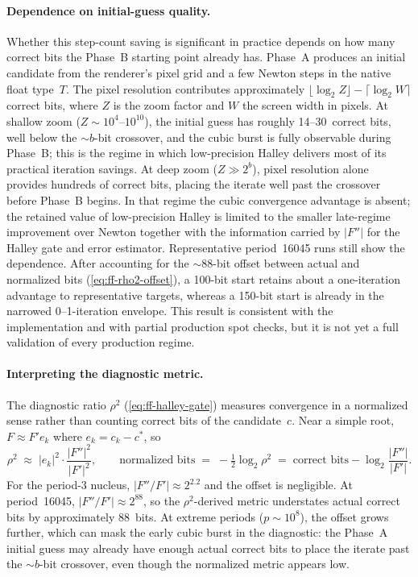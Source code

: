 \paragraph{Dependence on initial-guess quality.}
Whether this step-count saving is significant in practice depends on how many
correct bits the Phase~B starting point already has.  Phase~A produces an
initial candidate from the renderer's pixel grid and a few Newton steps in
the native float type~$T$.  The pixel resolution contributes approximately
$\lfloor\log_2 Z\rfloor - \lceil\log_2 W\rceil$ correct bits, where $Z$ is
the zoom factor and $W$ the screen width in pixels.  At shallow zoom
($Z \sim 10^{4}$--$10^{10}$), the initial guess has roughly 14--30~correct
bits, well below the ${\sim}b$-bit crossover, and the cubic burst is fully
observable during Phase~B; this is the regime in which low-precision Halley
delivers most of its practical iteration savings.  At deep zoom ($Z \gg 2^b$),
pixel resolution alone provides hundreds of correct bits, placing the iterate
well past the crossover before Phase~B begins.  In that regime the cubic
convergence advantage is absent; the retained value of low-precision Halley is
limited to the smaller late-regime improvement over Newton together with the
information carried by $|F''|$ for the Halley gate and error estimator.
Representative period~16045 runs still show the dependence.  After accounting
for the ${\sim}88$-bit offset between actual and normalized bits
(\cref{eq:ff-rho2-offset}), a 100-bit start retains about a one-iteration
advantage to representative targets, whereas a 150-bit start is already in the
narrowed 0--1-iteration envelope.  This result is consistent with the implementation
and with partial production spot checks, but it is not yet a full validation of
every production regime.

\paragraph{Interpreting the diagnostic metric.}
The diagnostic ratio $\rho^2$ (\cref{eq:ff-halley-gate}) measures
convergence in a normalized sense rather than counting correct bits of
the candidate~$c$.  Near a simple root, $F \approx F' e_k$ where
$e_k = c_k - c^*$, so
\begin{equation}\label{eq:ff-rho2-offset}
\rho^2 \;\approx\; |e_k|^2 \cdot \frac{|F''|^2}{|F'|^2},
\qquad
  \text{normalized bits}
  \;=\; -\tfrac{1}{2}\log_2 \rho^2
  \;=\; \text{correct bits} - \log_2 \frac{|F''|}{|F'|}.
\end{equation}
For the period-3 nucleus, $|F''/F'| \approx 2^{2.2}$ and the offset is
negligible.  At period~16045, $|F''/F'| \approx 2^{88}$, so the
$\rho^2$-derived metric understates actual correct bits by approximately
88~bits.  At extreme periods ($p \sim 10^8$), the offset grows further,
which can mask the early cubic burst in the diagnostic: the Phase~A
initial guess may already have enough actual correct bits to place the
iterate past the ${\sim}b$-bit crossover, even though the normalized
metric appears low.


